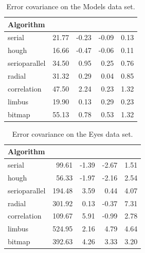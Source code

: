 \begin{table}[h]
\centering
\begin{tabular}{l@{\hspace{1.5cm}}D{.}{.}{3.2}D{.}{.}{3.2}D{.}{.}{3.2}D{.}{.}{3.2}}
\toprule
\textbf{Algorithm} &  &  &  & \\
\midrule
serial & 21.77 & -0.23 & -0.09 & 0.13\\
hough & 16.66 & -0.47 & -0.06 & 0.11\\
serioparallel & 34.50 & 0.95 & 0.25 & 0.76\\
radial & 31.32 & 0.29 & 0.04 & 0.85\\
correlation & 47.50 & 2.24 & 0.23 & 1.32\\
limbus & 19.90 & 0.13 & 0.29 & 0.23\\
bitmap & 55.13 & 0.78 & 0.53 & 1.32\\
\bottomrule
\end{tabular}
\caption{Error covariance on the Models data set.}\label{t:algo-covar-models}
\end{table}

\begin{table}[h]
\centering
\begin{tabular}{l@{\hspace{1.5cm}}D{.}{.}{3.2}D{.}{.}{3.2}D{.}{.}{3.2}D{.}{.}{3.2}}
\toprule
\textbf{Algorithm} &  &  &  & \\
\midrule
serial & 99.61 & -1.39 & -2.67 & 1.51\\
hough & 56.33 & -1.97 & -2.16 & 2.54\\
serioparallel & 194.48 & 3.59 & 0.44 & 4.07\\
radial & 301.92 & 0.13 & -0.37 & 7.31\\
correlation & 109.67 & 5.91 & -0.99 & 2.78\\
limbus & 524.95 & 2.16 & 4.79 & 4.64\\
bitmap & 392.63 & 4.26 & 3.33 & 3.20\\
\bottomrule
\end{tabular}
\caption{Error covariance on the Eyes data set.}\label{t:algo-covar-eyes}
\end{table}

